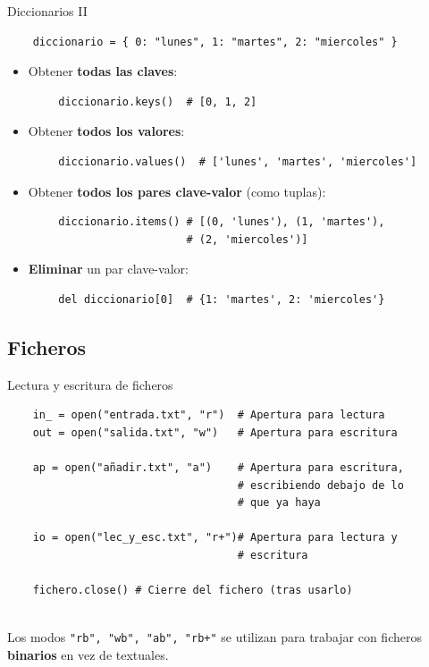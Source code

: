 \documentclass[10pt]{beamer} %
\begin{document}
\begin{frame}[fragile]{Diccionarios II}
    \begin{verbatim}
    diccionario = { 0: "lunes", 1: "martes", 2: "miercoles" }
    \end{verbatim}
    \begin{itemize}
        \item Obtener \textbf{todas las claves}:
    \end{itemize}
    \begin{verbatim}
        diccionario.keys()  # [0, 1, 2]
    \end{verbatim}
    \begin{itemize}
        \item Obtener \textbf{todos los valores}:
    \end{itemize}
    \begin{verbatim}
        diccionario.values()  # ['lunes', 'martes', 'miercoles']
    \end{verbatim}
    \begin{itemize}
        \item Obtener \textbf{todos los pares clave-valor} (como tuplas):
    \end{itemize}
    \begin{verbatim}
        diccionario.items() # [(0, 'lunes'), (1, 'martes'),
                            # (2, 'miercoles')]
    \end{verbatim}
    \begin{itemize}
        \item \textbf{Eliminar} un par clave-valor:
    \end{itemize}
    \begin{verbatim}
        del diccionario[0]  # {1: 'martes', 2: 'miercoles'}
    \end{verbatim}
\end{frame}

\subsection{Ficheros}
\begin{frame}[fragile]{Lectura y escritura de ficheros}
    \begin{verbatim}
    in_ = open("entrada.txt", "r")  # Apertura para lectura
    out = open("salida.txt", "w")   # Apertura para escritura
    
    ap = open("añadir.txt", "a")    # Apertura para escritura,
                                    # escribiendo debajo de lo
                                    # que ya haya
                                    
    io = open("lec_y_esc.txt", "r+")# Apertura para lectura y
                                    # escritura

    fichero.close() # Cierre del fichero (tras usarlo)
    
    \end{verbatim}
    Los modos \texttt{"rb", "wb", "ab", "rb+"} se utilizan para trabajar con ficheros \textbf{binarios} en vez de textuales.
\end{frame}
\end{document}
